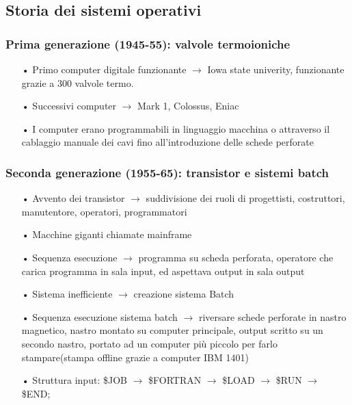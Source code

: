 \documentclass{article}
\begin{document}
\subsection{Storia dei sistemi operativi}
\subsubsection{Prima generazione (1945-55): valvole termoioniche}
\begin{enumerate}
   \item[•] Primo computer digitale funzionante $\rightarrow$ Iowa state univerity, funzionante grazie a 300 valvole termo.
   \item[•] Successivi computer $\rightarrow$ Mark 1, Colossus, Eniac 
   \item[•] I computer erano programmabili in linguaggio macchina o attraverso il cablaggio manuale dei cavi fino all’introduzione delle schede perforate
\end{enumerate}

\subsubsection{Seconda generazione (1955-65): transistor e sistemi batch}
\begin{enumerate}
   \item[•] Avvento dei transistor $\rightarrow$ suddivisione dei ruoli di progettisti, costruttori, manutentore, operatori, programmatori
   \item[•] Macchine giganti chiamate mainframe
   \item[•] Sequenza esecuzione $\rightarrow$ programma su scheda perforata, operatore che carica programma in sala input, ed aspettava output in sala output
   \item[•] Sistema inefficiente $\rightarrow$ creazione sistema Batch
   \item[•] Sequenza esecuzione sistema batch $\rightarrow$ riversare schede perforate in nastro magnetico, nastro montato su computer principale, output scritto su un secondo nastro, portato ad un computer più piccolo per farlo stampare(stampa offline grazie a computer IBM 1401)
   \item[•] Struttura input: \$JOB $\rightarrow$ \$FORTRAN $\rightarrow$ \$LOAD $\rightarrow$ \$RUN $\rightarrow$ \$END; 
\end{enumerate}
\end{document}
